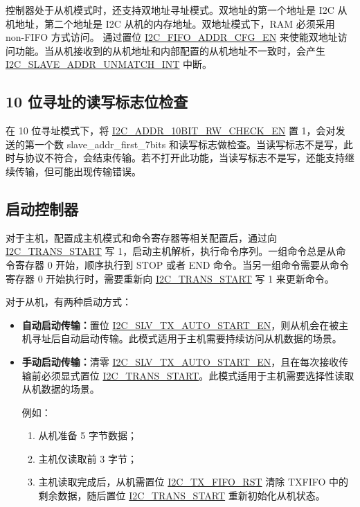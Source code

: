 \documentclass[main\_\_CN.tex]{subfiles}
\begin{document}
控制器处于从机模式时，还支持双地址寻址模式。双地址的第一个地址是 I2C 从机地址，第二个地址是 I2C 从机的内存地址。双地址模式下，RAM 必须采用 non-FIFO 方式访问。
通过置位 \hyperref[fielddesc:I2CFIFOADDRCFGEN]{I2C\_FIFO\_ADDR\_CFG\_EN} 来使能双地址访问功能。当从机接收到的从机地址和内部配置的从机地址不一致时，会产生 \hyperref[int:i2c-slave-addr]{I2C\_SLAVE\_ADDR\_UNMATCH\_INT} 中断。
 
\subsection{10 位寻址的读写标志位检查}
在 10 位寻址模式下，将 \hyperref[fielddesc:I2CADDR10BITRWCHECKEN]{I2C\_ADDR\_10BIT\_RW\_CHECK\_EN} 置 1，会对发送的第一个数 slave\_addr\_first\_7bits 和读写标志做检查。当读写标志不是写，此时与协议不符合，会结束传输。若不打开此功能，当读写标志不是写，还能支持继续传输，但可能出现传输错误。

\subsection{启动控制器}
\label{subsubsec:i2c-start}
对于主机，配置成主机模式和命令寄存器等相关配置后，通过向 \hyperref[fielddesc:I2CTRANSSTART]{I2C\_TRANS\_START} 写 1，启动主机解析，执行命令序列。一组命令总是从命令寄存器 0 开始，顺序执行到 STOP 或者 END 命令。当另一组命令需要从命令寄存器 0 开始执行时，需要重新向 \hyperref[fielddesc:I2CTRANSSTART]{I2C\_TRANS\_START} 写 1 来更新命令。

对于从机，有两种启动方式：
\begin{itemize}
    \item \textbf{自动启动传输：}置位 \hyperref[fielddesc:I2CSLVTXAUTOSTARTEN]{I2C\_SLV\_TX\_AUTO\_START\_EN}，则从机会在被主机寻址后自动启动传输。此模式适用于主机需要持续访问从机数据的场景。
    \item \textbf{手动启动传输：}清零 \hyperref[fielddesc:I2CSLVTXAUTOSTARTEN]{I2C\_SLV\_TX\_AUTO\_START\_EN}，且在每次接收传输前必须显式置位 \hyperref[fielddesc:I2CTRANSSTART]{I2C\_TRANS\_START}。此模式适用于主机需要选择性读取从机数据的场景。

例如：
\begin{enumerate}
\item 从机准备 5 字节数据；
\item 主机仅读取前 3 字节；
\item 主机读取完成后，从机需置位 \hyperref[fielddesc:I2CTXFIFORST]{I2C\_TX\_FIFO\_RST} 清除 TXFIFO 中的剩余数据，随后置位 \hyperref[fielddesc:I2CTRANSSTART]{I2C\_TRANS\_START} 重新初始化从机状态。
\end{enumerate}

\end{itemize}
\end{document}
